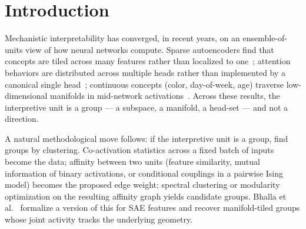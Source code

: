 \documentclass[11pt]{article}
\begin{document}
\begin{abstract}
more so on inputs outside the discovered route stratum than inside, in the
direction opposite to a route-conditional circuit. Finally, extending the
same closure test across training checkpoints, we find that two other cheap
proxies --- attention-to-target selectivity and participation ratio --- also
fail to track closure-validated function: BOS-head function is load-bearing
$\approx 2$B tokens before its attention pattern forms (function without
form, in two dense architectures), while previous-token heads can show a
sharp attention pattern and high participation ratio with no closure signal
(form without function). We conclude that, for attention-head circuits, a
cheap signal --- cluster membership, attention selectivity, or participation
ratio --- is a circuit \emph{proposal} rather than a confirmed circuit:
closure testing is what separates the two, it is necessary in the dense
models we study and not yet sufficient in the MoE setting even after route
conditioning, and multi-metric closure reporting (target-logit and accuracy
as primary indicators, loss as a conservative floor) is the right way to
read tests of this form.
\end{abstract}

\section{Introduction}

Mechanistic interpretability has converged, in recent years, on an
ensemble-of-units view of how neural networks compute. Sparse autoencoders
find that concepts are tiled across many features rather than localized to
one~\cite{bhalla2026}; attention behaviors are distributed across multiple
heads rather than implemented by a canonical single
head~\cite{goodfire2026}; continuous concepts (color, day-of-week, age)
traverse low-dimensional manifolds in mid-network
activations~\cite{engels2024,park2024geometry}. Across these results, the
interpretive unit is a group --- a subspace, a manifold, a head-set --- and
not a direction.

A natural methodological move follows: if the interpretive unit is a group,
find groups by clustering. Co-activation statistics across a fixed batch of
inputs become the data; affinity between two units (feature similarity,
mutual information of binary activations, or conditional couplings in a
pairwise Ising model) becomes the proposed edge weight; spectral clustering
or modularity optimization on the resulting affinity graph yields candidate
groups. Bhalla et al.~\cite{bhalla2026} formalize a version of this for SAE
features and recover manifold-tiled groups whose joint activity tracks the
underlying geometry.
\end{document}
